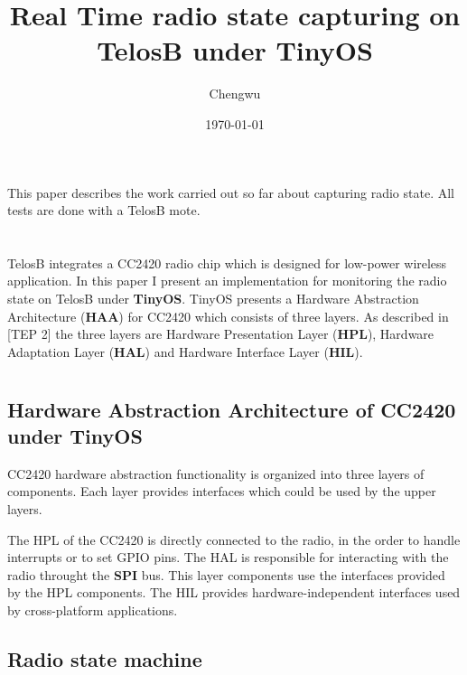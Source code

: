 \documentclass[a4paper,11pt]{article}
\title{Real Time radio state capturing on TelosB under TinyOS}
\author{Chengwu \sc{Huang}}
\date{\today}
\begin{document}
\maketitle
\tableofcontents

\newpage

\section*{}


This paper describes the work carried out so far about capturing radio state.
All tests are done with a TelosB mote.

\section{}


TelosB integrates a CC2420 radio chip which is designed for low-power wireless
application. In this paper I present an implementation for monitoring the radio state on TelosB under \textbf{TinyOS}.
TinyOS presents a Hardware Abstraction Architecture (\textbf{HAA}) for CC2420 which consists of three layers. As described in [TEP 2] the three layers are Hardware Presentation Layer (\textbf{HPL}), Hardware Adaptation Layer (\textbf{HAL}) and Hardware Interface Layer (\textbf{HIL}).

\section{}

  \subsection{Hardware Abstraction Architecture of CC2420 under TinyOS}


CC2420 hardware abstraction functionality is organized into three layers of components. Each layer provides interfaces which could be used by the upper layers.

The HPL of the CC2420 is directly connected to the radio, in the order to handle interrupts or to set GPIO pins.
The HAL is responsible for interacting with the radio throught the \textbf{SPI} bus. This layer components use the interfaces provided by the HPL components.
The HIL provides hardware-independent interfaces used by cross-platform applications.

  \subsection{Radio state machine}
\end{document}

